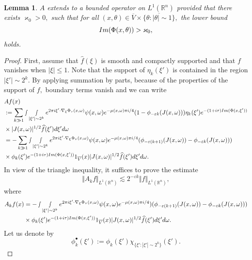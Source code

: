 \documentclass[12pt, reqno]{amsart}
\newtheorem{lemma}[theorem]{Lemma}
\theoremstyle{definition}
\theoremstyle{remark}
\numberwithin{equation}{section}
\begin{document}
\begin{lemma}\label{boundedness:A}
    $A$ extends to a bounded operator on $L^1(\mathbb{R}^n)$ provided that there exists $\varkappa_0>0,$ such that for all $(x,\theta)\in \overline{V}\times \overline{\{\theta: |\theta|\sim 1\}},$ the lower bound $$\textnormal{Im}(\Phi(x,\theta))>\varkappa_0,$$ holds.
\end{lemma}
\begin{proof}First, assume that $\widehat{f}(\xi)$ is smooth and compactly supported and that $f$ vanishes when $|\xi|\leq 1.$ Note that the support of $\eta_{k}(\xi')$ is contained in the region $|\xi'|\sim 2^ k.$
By applying summation by parts, because of the properties of the support of $f,$ boundary terms vanish and we can write
\begin{align*}
  &Af(x)\\
  &:= \sum_{k\gg 1}\smallint\smallint_{|\xi'|\sim 2^ k} e^{2\pi i\xi'\cdot \nabla_\xi\Phi_\tau(x,\omega)}\psi(x,\omega)e^{-\mu(x,\omega)\pi i/4} (1-\phi_{-\varepsilon k}(J(x,\omega)))\eta_{k}(\xi')e^{-(1+i\tau)\textnormal{Im}(\Phi(x,\xi'))}\\
&\times |J(x,\omega)|^{1/2}\widehat{f}(\xi')d\xi'd\omega\\
&=- \sum_{k\gg 1}\smallint\smallint_{|\xi'|\sim 2^ k} e^{2\pi i\xi'\cdot \nabla_\xi\Phi_\tau(x,\omega)}\psi(x,\omega)e^{-\mu(x,\omega)\pi i/4} (\phi_{-\varepsilon (k+1)}(J(x,\omega))-\phi_{-\varepsilon k}(J(x,\omega)))\\
&\times \phi_{k}(\xi')e^{-(1+i\tau)\textnormal{Im}(\Phi(x,\xi'))} 1_{\overline{V}}(x)|J(x,\omega)|^{1/2}\widehat{f}(\xi')d\xi'd\omega.
\end{align*}
In view of the triangle inequality, it suffices to prove  the estimate
\begin{equation}
    \Vert A_k f\Vert_{L^1(\mathbb{R}^n)}\lesssim 2^{-\varepsilon k}\Vert f\Vert_{L^1(\mathbb{R}^n)},
\end{equation} where 
\begin{align*}
    A_kf(x)&=- \smallint\smallint_{|\xi'|\sim 2^ k} e^{2\pi i\xi'\cdot \nabla_\xi\Phi_\tau(x,\omega)}\psi(x,\omega)e^{-\mu(x,\omega)\pi i/4}) (\phi_{-\varepsilon (k+1)}(J(x,\omega))-\phi_{-\varepsilon k}(J(x,\omega)))\\
&\times \phi_{k}(\xi')e^{-(1+i\tau)\textnormal{Im}(\Phi(x,\xi'))} 1_{\overline{V}}(x) |J(x,\omega)|^{1/2}\widehat{f}(\xi')d\xi'd\omega. 
\end{align*}
Let us denote by $$\phi_k^\bullet(\xi'):=\phi_k(\xi')\chi_{ \{\xi': |\xi'|\sim 2^k\} }(\xi').$$

\end{proof}
\end{document}
